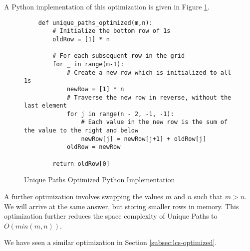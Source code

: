 A Python implementation of this optimization is given in Figure \ref{fig:unique-paths-optimized}.

\begin{figure}[H]
    \centering
    \begin{lstlisting}
    def unique_paths_optimized(m,n):
        # Initialize the bottom row of 1s
        oldRow = [1] * n
    
        # For each subsequent row in the grid
        for _ in range(m-1):
            # Create a new row which is initialized to all 1s
            newRow = [1] * n
            # Traverse the new row in reverse, without the last element
            for j in range(n - 2, -1, -1):
                # Each value in the new row is the sum of the value to the right and below
                newRow[j] = newRow[j+1] + oldRow[j]
            oldRow = newRow
    
        return oldRow[0]
    \end{lstlisting}
    \caption{Unique Paths Optimized Python Implementation}
    \label{fig:unique-paths-optimized}
\end{figure}

A further optimization involves swapping the values $m$ and $n$ such that $m > n$. We will arrive at the same answer, but storing smaller rows in memory.
This optimization further reduces the space complexity of Unique Paths to $O(min(m,n))$.

We have seen a similar optimization in Section \ref{subsec:lcs-optimized}.
\newpage